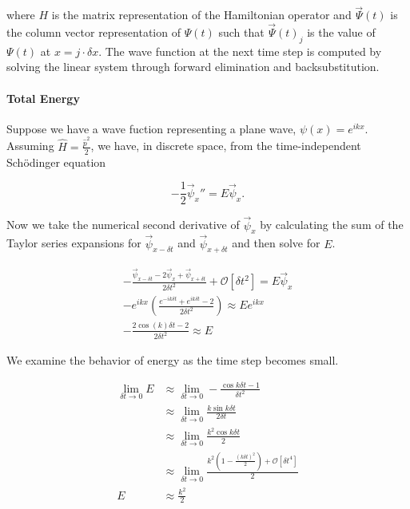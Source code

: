 where $H$ is the matrix representation of the Hamiltonian operator and
$\vec{\Psi}(t)$ is the column vector representation of $\Psi(t)$ such that
$\vec{\Psi}(t)_j$ is the value of $\Psi(t)$ at $x = j \cdot \delta x$. The
wave function at the next time step is computed by solving the linear system
through forward elimination and backsubstitution.

\paragraph{Total Energy} Suppose we have a wave fuction representing a plane
wave, $\psi(x) = e^{ikx}$. Assuming $\hat{H} = \frac{\hat{p}^2}{2}$, we have,
in discrete space, from the time-independent Schödinger equation

\[
    -\frac{1}{2}\vec{\psi}_x'' = E \vec{\psi}_x.
\]

Now we take the numerical second derivative of $\vec{\psi}_x$ by calculating
the sum of the Taylor series expansions for $\vec{\psi}_{x - \delta t}$ and
$\vec{\psi}_{x + \delta t}$ and then solve for $E$.

\begin{gather*}
    -\frac{\vec{\psi}_{x - \delta t} - 2\vec{\psi}_x + \vec{\psi}_{x +
    \delta t}}{2 \delta t^2} + \mathcal{O}\left[\delta t^2\right]
    = E \vec{\psi}_x
    \\
    -e^{ikx}
    \left(
    \frac{e^{-ik\delta t} + e^{ik\delta t} - 2}{2 \delta t^2}
    \right)
    \approx E e^{ikx}
    \\
    -\frac{2\cos(k)\delta t - 2}{2\delta t^2} \approx E
\end{gather*}

\pagebreak

We examine the behavior of energy as the time step becomes small.

\begin{align}
    \lim_{\delta t \to 0} E
    &\approx
    \lim_{\delta t \to 0} -\frac{\cos{k\delta t} - 1}{\delta t^2}
    \nonumber
    \\
    &\approx \lim_{\delta t \to 0} \frac{k\sin{k\delta t}}{2\delta t}
    \nonumber
    \\
    &\approx \lim_{\delta t \to 0} \frac{k^2\cos{k\delta t}}{2}
    \nonumber
    \\
    &\approx \lim_{\delta t \to 0}
    \frac{k^2 \left( 1 - \frac{(k\delta t) ^ 2}{2} \right) +
    \mathcal{O}\left[\delta t^4\right]}{2}
    \nonumber
    \\
    E &\approx \frac{k^2}{2}
    \label{eq:EnoV}
\end{align}

